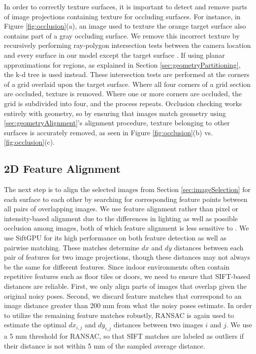 \documentclass[]{spie}  %
\begin{document}
In order to correctly texture surfaces, it is important to detect and
remove parts of image projections containing texture for occluding
surfaces. For instance, in Figure \ref{fig:occlusion}(a), an image
used to texture the orange target surface also contains part of a gray
occluding surface. We remove this incorrect texture by recursively
performing ray-polygon intersection tests between the camera location
and every surface in our model except the target surface
\cite{rayintersection}. If using planar approximations for regions, as
explained in Section \ref{sec:geometryPartitioning}, the k-d tree is
used instead. These intersection tests are performed at the corners of
a grid overlaid upon the target surface. Where all four corners of a
grid section are occluded, texture is removed. Where one or more
corners are occluded, the grid is subdivided into four, and the
process repeats. Occlusion checking works entirely with geometry, so
by ensuring that images match geometry using
\ref{sec:geometryAlignment}'s alignment procedure, texture belonging
to other surfaces is accurately removed, as seen in Figure
\ref{fig:occlusion}(b) vs. \ref{fig:occlusion}(c).

\subsection{2D Feature Alignment}
\label{sec:robustSIFTFeatureMatching}
The next step is to align the selected images from Section
\ref{sec:imageSelection} for each surface to each other by searching
for corresponding feature points between all pairs of overlapping
images. We use feature alignment rather than pixel or intensity-based
alignment due to the differences in lighting as well as possible
occlusion among images, both of which feature alignment is less
sensitive to \cite{lowe1999object, mikolajczyk2005performance,
  szeliski2006image}. We use SiftGPU \cite{siftgpu} for its high
performance on both feature detection as well as pairwise
matching. These matches determine $dx$ and $dy$ distances between each
pair of features for two image projections, though these distances may
not always be the same for different features. Since indoor
environments often contain repetitive features such as floor tiles or
doors, we need to ensure that SIFT-based distances are
reliable. First, we only align parts of images that overlap given the
original noisy poses. Second, we discard feature matches that
correspond to an image distance greater than 200 mm from what the
noisy poses estimate. In order to utilize the remaining feature
matches robustly, RANSAC \cite{fischler1981random} is again used to
estimate the optimal $dx_{i,j}$ and $dy_{i,j}$ distances between two
images $i$ and $j$. We use a 5 mm threshold for RANSAC, so that SIFT
matches are labeled as outliers if their distance is not within 5 mm
of the sampled average distance.
\end{document}
